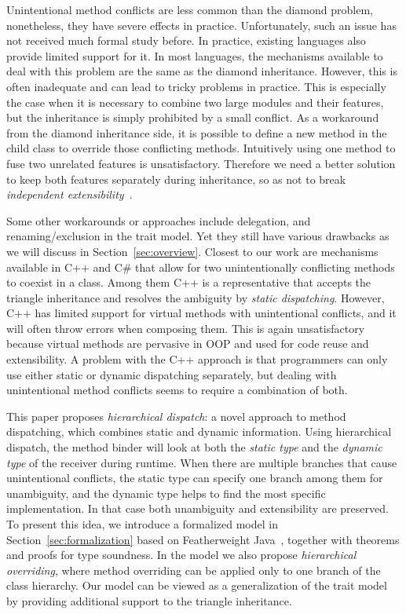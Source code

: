 Unintentional method conflicts are less common than the diamond
problem, nonetheless, they have severe effects in practice. 
Unfortunately, such an issue has not received much formal study 
before. In practice, existing languages also provide limited support for
it. In most languages, the mechanisms available to deal with this problem are the same as the diamond
inheritance. However, this is often inadequate and can lead 
to tricky problems in practice. This is especially the case
when it is necessary to combine two large modules and their features,
but the inheritance is simply prohibited by a small conflict. As
a workaround from the diamond inheritance side, it is possible to
define a new method in the child class to override those conflicting
methods. Intuitively using one method to fuse two unrelated features
is unsatisfactory. Therefore we need a better solution to keep both
features separately during inheritance, so as not to break
\emph{independent extensibility}~\cite{zenger05independentlyextensible}.

Some other workarounds or approaches include delegation, and
renaming/exclusion in the trait model. Yet they still have various
drawbacks as we will discuss in Section~\ref{sec:overview}. Closest to our work
are mechanisms available in C++ and C\# that allow for two
unintentionally conflicting methods to coexist in a class. Among them
C++ is a representative that accepts the triangle inheritance and
resolves the ambiguity by \emph{static dispatching}. However, C++ has
limited support for virtual methods with unintentional conflicts, and
it will often throw errors when composing them. This is again
unsatisfactory because virtual methods are pervasive in OOP and used 
for code reuse and extensibility. A problem with the C++ approach is
that programmers can only use either static or dynamic dispatching separately, but dealing
with unintentional method conflicts seems to require a combination of both. 


This paper proposes \textit{hierarchical dispatch}: a novel approach
to method dispatching, which combines static and dynamic
information. Using hierarchical dispatch, the method binder will look
at both the \emph{static type} and the \emph{dynamic type} of the
receiver during runtime. When there are multiple branches that cause
unintentional conflicts, the static type can specify one branch among
them for unambiguity, and the dynamic type helps to find the most
specific implementation. In that case both unambiguity and
extensibility are preserved. To present this idea, we introduce a
formalized model \MIM{} in Section~\ref{sec:formalization} based on
Featherweight Java~\cite{Igarashi01FJ}, together with theorems and
proofs for type soundness. In the model we also propose
\textit{hierarchical overriding}, where method overriding can be applied
only to one branch of the class hierarchy. Our model can be viewed as
a generalization of the trait model by providing additional support to
the triangle inheritance.

